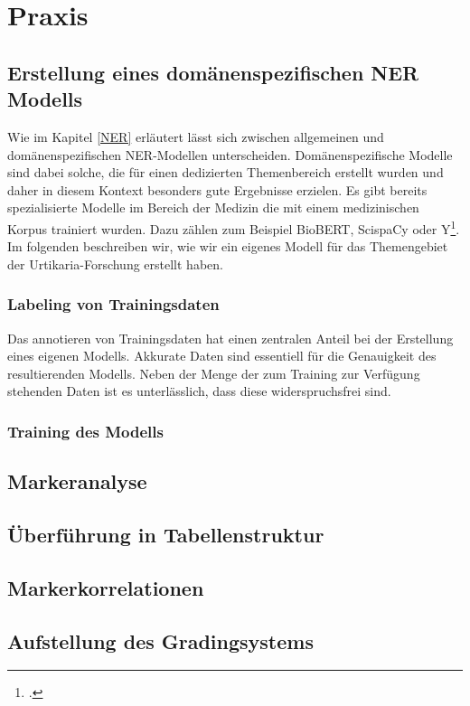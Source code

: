 \newpage
\section{Praxis} \label{latexDetails}
\subsection{Erstellung eines domänenspezifischen NER Modells}
Wie im Kapitel \ref{NER} erläutert lässt sich zwischen allgemeinen und domänenspezifischen \ac{NER}-Modellen unterscheiden. Domänenspezifische Modelle sind dabei solche, die für einen dedizierten Themenbereich erstellt wurden und daher in diesem Kontext besonders gute Ergebnisse erzielen.
Es gibt bereits spezialisierte Modelle im Bereich der Medizin die mit einem medizinischen Korpus trainiert wurden. Dazu zählen zum Beispiel BioBERT, ScispaCy oder Y\footcite[S.12]{li2020}. Im folgenden beschreiben wir, wie wir ein eigenes Modell für das Themengebiet der Urtikaria-Forschung erstellt haben.
\subsubsection{Labeling von Trainingsdaten}
Das annotieren von Trainingsdaten hat einen zentralen Anteil bei der Erstellung eines eigenen Modells. Akkurate Daten sind essentiell für die Genauigkeit des resultierenden Modells. Neben der Menge der zum Training zur Verfügung stehenden Daten ist es unterlässlich, dass diese widerspruchsfrei sind.
\subsubsection{Training des Modells}
\subsection{Markeranalyse}
\subsection{Überführung in Tabellenstruktur}
\subsection{Markerkorrelationen}
\subsection{Aufstellung des Gradingsystems}
